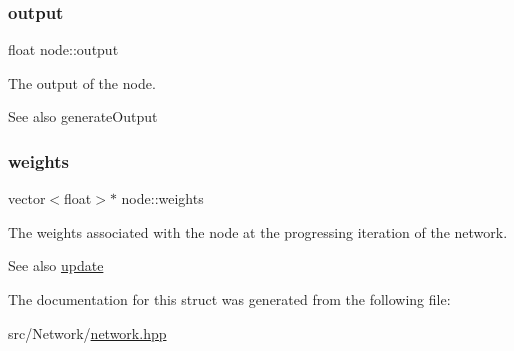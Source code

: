\subsubsection{\texorpdfstring{output}{output}}
{\footnotesize\ttfamily float node\+::output}



The output of the node. 

\begin{DoxySeeAlso}{See also}
generate\+Output 
\end{DoxySeeAlso}
\hypertarget{structnode_a641a543a1870b1daa208ca9a6bf456c7}{}\label{structnode_a641a543a1870b1daa208ca9a6bf456c7} 
\subsubsection{\texorpdfstring{weights}{weights}}
{\footnotesize\ttfamily vector$<$float$>$$\ast$ node\+::weights}



The weights associated with the node at the progressing iteration of the network. 

\begin{DoxySeeAlso}{See also}
\hyperlink{network_8hpp_a090940f06a6c4b23d03afca1d8b2cf10}{update} 
\end{DoxySeeAlso}


The documentation for this struct was generated from the following file\+:\begin{DoxyCompactItemize}
\item 
src/\+Network/\hyperlink{network_8hpp}{network.\+hpp}\end{DoxyCompactItemize}
